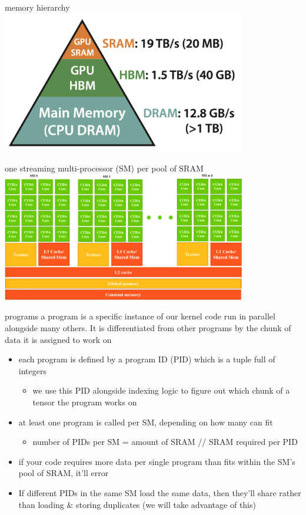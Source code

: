 \documentclass[aspectratio=169]{beamer}
\begin{document}
\begin{frame}{memory hierarchy}
\centering
\includegraphics[width=0.8\textwidth]{pics/mem_hierarchy.png}
\end{frame}

\begin{frame}{one streaming multi-processor (SM) per pool of SRAM}
\centering
\includegraphics[width=0.8\textwidth]{pics/SM.png}
\end{frame}

\begin{frame}{programs}
\vspace{-0.5in}
a program is a specific instance of our kernel code run in parallel alongside many others. It is differentiated from other programs by the chunk of data it is assigned to work on
\begin{itemize}
    \item each program is defined by a program ID (PID) which is a tuple full of integers
    \begin{itemize}
        \item we use this PID alongside indexing logic to figure out which chunk of a tensor the program works on
    \end{itemize}
    \item at least one program is called per SM, depending on how many can fit
        \begin{itemize}
            \item number of PIDs per SM = amount of SRAM // SRAM required per PID
        \end{itemize}
    \item if your code requires more data per single program than fits within the SM's pool of SRAM, it'll error
    \item If different PIDs in the same SM load the same data, then they'll share rather than loading \& storing duplicates (we will take advantage of this)
\end{itemize}
\end{frame}
\end{document}
